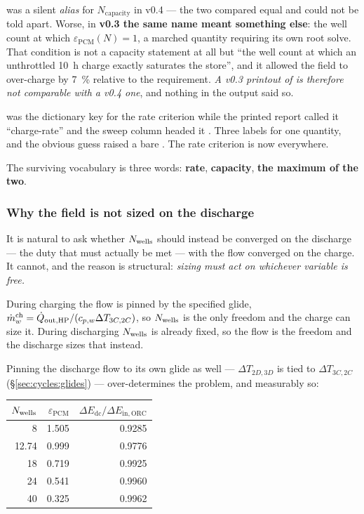 \begin{description}[leftmargin=1.9em,itemsep=3pt]
\item[\code{N\_inventory}] was a silent \emph{alias} for
  $N_{\mathrm{capacity}}$ in v0.4 --- the two compared equal and could not be
  told apart. Worse, in \textbf{v0.3 the same name meant something else}: the
  well count at which $\varepsilon_{\mathrm{PCM}}(N)=1$, a marched quantity
  requiring its own root solve. That condition is not a capacity statement at
  all but ``the well count at which an unthrottled \SI{10}{\hour} charge
  exactly saturates the store'', and it allowed the field to over-charge by
  \SI{7}{\percent} relative to the requirement. \emph{A v0.3 printout of
   is therefore not comparable with a v0.4 one}, and nothing
  in the output said so.
\item[\code{N\_heat}] was the dictionary key for the rate criterion while the
  printed report called it ``charge-rate'' and the sweep column headed it
  . Three labels for one quantity, and the obvious guess
   raised a bare . The rate criterion is now
   everywhere.
\end{description}

\noindent
The surviving vocabulary is three words: \textbf{rate}, \textbf{capacity},
\textbf{the maximum of the two}.

\subsubsection*{Why the field is not sized on the discharge}

It is natural to ask whether $N_{\mathrm{wells}}$ should instead be converged on the
discharge --- the duty that must actually be met --- with the flow converged on
the charge. It cannot, and the reason is structural: \emph{sizing must act on
whichever variable is free.}

During charging the flow is pinned by the specified glide,
$\dot m_{w}^{\mathrm{ch}} = \dot Q_{\mathrm{out,HP}}/(c_{p,w}\Delta T_{3C,2C})$, so
$N_{\mathrm{wells}}$ is the only freedom and the charge can size it. During discharging
$N_{\mathrm{wells}}$ is already fixed, so the flow is the freedom and the discharge sizes
that instead.

Pinning the discharge flow to its own glide as well --- $\Delta T_{2D,3D}$ is
tied to $\Delta T_{3C,2C}$ (\S\ref{sec:cycles:glides}) --- over-determines the
problem, and measurably so:

\begin{center}
\begin{tabular}{@{}r r r@{}}
\toprule
$N_{\mathrm{wells}}$ & $\varepsilon_{\mathrm{PCM}}$ & $\Delta E_{\mathrm{dc}}/\Delta E_{\mathrm{in,ORC}}$ \\
\midrule
 8    & 1.505 & 0.9285 \\
12.74 & 0.999 & 0.9776 \\
18    & 0.719 & 0.9925 \\
24    & 0.541 & 0.9960 \\
40    & 0.325 & 0.9962 \\
\bottomrule
\end{tabular}
\end{center}

